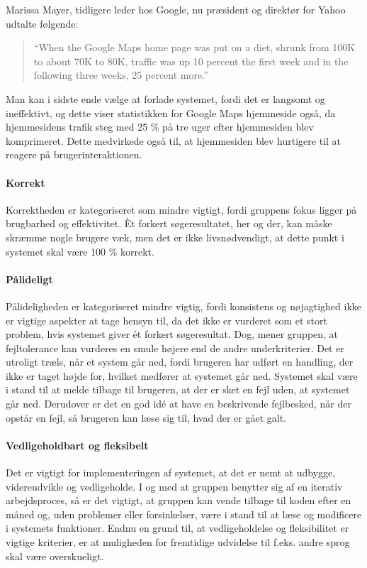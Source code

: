 Marissa Mayer, tidligere leder hos Google, nu præsident og direktør for Yahoo udtalte følgende:\cite{googlespeed}
\begin{quote}
``When the Google Maps home page was put on a diet, shrunk from 100K to about 70K to 80K, traffic was up 10 percent the first week and in the following three weeks, 25 percent more.''
\end{quote}  

Man kan i sidste ende vælge at forlade systemet, fordi det er langsomt og ineffektivt, og dette viser statistikken for Google Maps hjemmeside også, da hjemmesidens trafik steg med 25 \% på tre uger efter hjemmesiden blev komprimeret. Dette medvirkede også til, at hjemmesiden blev hurtigere til at reagere på brugerinteraktionen.

\paragraph{Korrekt} Korrektheden er kategoriseret som mindre vigtigt, fordi gruppens fokus ligger på brugbarhed og effektivitet. Èt forkert søgeresultatet, her og der, kan måske skræmme nogle brugere væk, men det er ikke livsnødvendigt, at dette punkt i systemet skal være 100 \% korrekt.

\paragraph{Pålideligt} Pålideligheden er kategoriseret mindre vigtig, fordi konsistens og nøjagtighed ikke er vigtige aspekter at tage hensyn til, da det ikke er vurderet som et stort problem, hvis systemet giver ét forkert søgeresultat. Dog, mener gruppen, at fejltolerance kan vurderes en smule højere end de andre underkriterier. Det er utroligt træls, når et system går ned, fordi brugeren har udført en handling, der ikke er taget højde for, hvilket medfører at systemet går ned. Systemet skal være i stand til at melde tilbage til brugeren, at der er sket en fejl uden, at systemet går ned. Derudover er det en god idé at have en beskrivende fejlbesked, når der opstår en fejl, så brugeren kan læse sig til, hvad der er gået galt.

\paragraph{Vedligeholdbart og fleksibelt} Det er vigtigt for implementeringen af systemet, at det er nemt at udbygge, videreudvikle og vedligeholde. I og med at gruppen benytter sig af en iterativ arbejdsproces, så er det vigtigt, at gruppen kan vende tilbage til koden efter en måned og, uden problemer eller forsinkelser, være i stand til at læse og modificere i systemets funktioner. Endnu en grund til, at vedligeholdelse og fleksibilitet er vigtige kriterier, er at muligheden for fremtidige udvidelse til f.eks. andre sprog skal være overskueligt.

